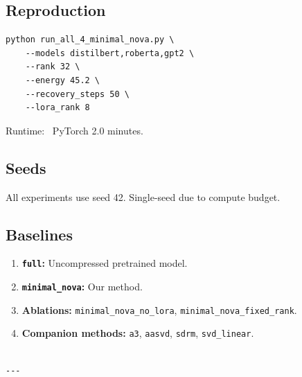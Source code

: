 \subsection{Reproduction}

\begin{lstlisting}
python run_all_4_minimal_nova.py \
    --models distilbert,roberta,gpt2 \
    --rank 32 \
    --energy 45.2 \
    --recovery_steps 50 \
    --lora_rank 8
\end{lstlisting}

Runtime: ~PyTorch 2.0 minutes.

\subsection{Seeds}

All experiments use seed 42. Single-seed due to compute budget.

\subsection{Baselines}

\begin{enumerate}
\item \textbf{\texttt{full}:} Uncompressed pretrained model.
\item \textbf{\texttt{minimal\_nova}:} Our method.
\item \textbf{Ablations:} \texttt{minimal\_nova\_no\_lora}, \texttt{minimal\_nova\_fixed\_rank}.
\item \textbf{Companion methods:} \texttt{a3}, \texttt{aasvd}, \texttt{sdrm}, \texttt{svd\_linear}.
\end{enumerate}
\begin{lstlisting}

---
\end{lstlisting}